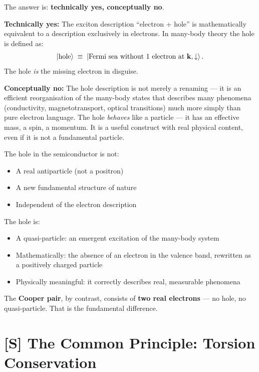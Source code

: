 The answer is: \textbf{technically yes, conceptually no}.

\textbf{Technically yes:}
The exciton description ``electron + hole'' is mathematically
equivalent to a description exclusively in electrons.
In many-body theory the hole is defined as:
\begin{equation}
  \left|\text{hole}\right\rangle \;\equiv\; \left|\text{Fermi sea without 1 electron at }
  \mathbf{k}, \downarrow\right\rangle.
\end{equation}
The hole \emph{is} the missing electron in disguise.

\textbf{Conceptually no:}
The hole description is not merely a renaming ---
it is an efficient reorganisation of the many-body states
that describes many phenomena (conductivity, magnetotransport,
optical transitions) much more simply than pure
electron language.
The hole \emph{behaves} like a particle --- it has
an effective mass, a spin, a momentum.
It is a useful construct with real physical content,
even if it is not a fundamental particle.

\begin{keypoint}
The hole in the semiconductor is not:
\begin{itemize}
  \item A real antiparticle (not a positron)
  \item A new fundamental structure of nature
  \item Independent of the electron description
\end{itemize}

The hole is:
\begin{itemize}
  \item A quasi-particle: an emergent excitation of the
    many-body system
  \item Mathematically: the absence of an electron in the
    valence band, rewritten as a positively charged particle
  \item Physically meaningful: it correctly describes real,
    measurable phenomena
\end{itemize}

The \textbf{Cooper pair}, by contrast, consists of
\textbf{two real electrons} --- no hole,
no quasi-particle. That is the fundamental difference.
\end{keypoint}

\section{[S] The Common Principle: Torsion Conservation}
\label{sec:torsion-conservation}

